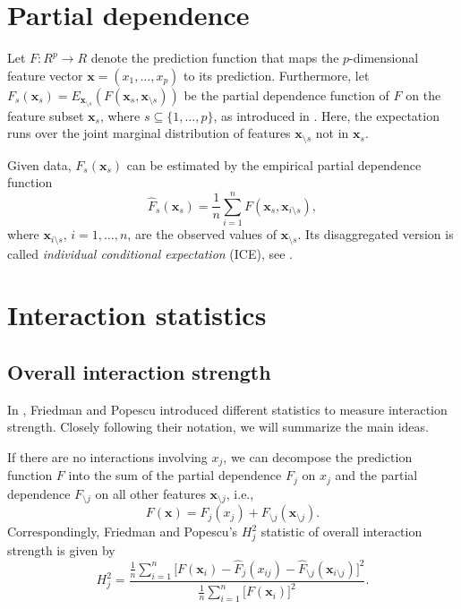 \documentclass[]{article}
\title{}
\author{}
\begin{document}
\section{Partial dependence}
Let $F: R^p \to R$ denote the prediction function that maps the $p$-dimensional feature vector $\mathbf{x} = (x_1, \dots, x_p)$ to its prediction.
Furthermore, let $F_s(\mathbf{x}_s) = E_{\mathbf{x}_{\setminus s}}(F(\mathbf{x}_s, \mathbf{x}_{\setminus s}))$ be the partial dependence function of $F$ on the feature subset $\mathbf{x}_s$, where $s \subseteq \{1, \dots, p\}$, as introduced in \cite{friedman2001}. Here, the expectation runs over the joint marginal distribution of features $\mathbf{x}_{\setminus s}$ not in $\mathbf{x}_s$.

Given data, $F_s(\mathbf{x}_s)$ can be estimated by the empirical partial dependence function
$$
  \hat F_s(\mathbf{x}_s) = \frac{1}{n} \sum_{i = 1}^n F(\mathbf{x}_s, \mathbf{x}_{i\setminus s}),
$$
where $\mathbf{x}_{i\setminus s}$, $i = 1, \dots, n$, are the observed values of $\mathbf{x}_{\setminus s}$. Its disaggregated version is called
{\em individual conditional expectation} (ICE), see \cite{goldstein2015}.

\section{Interaction statistics}

\subsection{Overall interaction strength}
In \cite{friedman2008}, Friedman and Popescu introduced different statistics to measure interaction strength. Closely following their notation, we will summarize the main ideas. 

If there are no interactions involving $x_j$, we can decompose the prediction function $F$ into the sum of the partial dependence $F_j$ on $x_j$ and the partial dependence $F_{\setminus j}$ on all other features $\mathbf{x}_{\setminus j}$, i.e.,
$$
	F(\mathbf{x}) = F_j(x_j) + F_{\setminus j}(\mathbf{x}_{\setminus j}).
$$
Correspondingly, Friedman and Popescu's $H^2_j$ statistic of overall interaction strength is given by
$$
	H_{j}^2 = \frac{\frac{1}{n} \sum_{i = 1}^n\big[F(\mathbf{x}_i) - \hat F_j(x_{ij}) - \hat F_{\setminus j}(\mathbf{x}_{i\setminus j})\big]^2}{\frac{1}{n} \sum_{i = 1}^n\big[F(\mathbf{x}_i)\big]^2}.
$$
\end{document}
